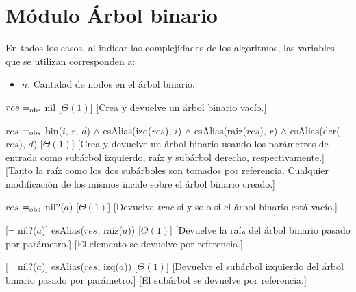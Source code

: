 \section{M\'odulo \'Arbol binario}

  En todos los casos, al indicar las complejidades de los algoritmos, las variables que se utilizan corresponden a:
  \vspace{-0.5em}\begin{itemize}
    \item $n$: Cantidad de nodos en el \'arbol binario.
  \end{itemize}


\begin{Interfaz}
  
  \begin{paramFormales}
    \paramGeneros{$\alpha$}
  \end{paramFormales}




    {$res =_{\mathrm{obs}}$ nil}
    [$\Theta(1)$]
    [Crea y devuelve un \'arbol binario vac\'io.]

    {$res$ $=_{\mathrm{obs}}$ bin($i$, $r$, $d$) $\land$ esAlias(izq($res$), $i$) $\land$ esAlias(raiz($res$), $r$) $\land$ esAlias(der($res$), $d$)}
    [$\Theta(1)$]
    [Crea y devuelve un \'arbol binario usando los par\'ametros de entrada como sub\'arbol izquierdo, ra\'iz y sub\'arbol derecho, respectivamente.]
    [Tanto la ra\'iz como los dos sub\'arboles son tomados por referencia. Cualquier modificaci\'on de los mismos incide sobre el \'arbol binario creado.]

    {$res$ $=_{\mathrm{obs}}$ nil?($a$)}
    [$\Theta(1)$]
    [Devuelve \emph{true} si y solo si el \'arbol binario est\'a vac\'io.]

    [$\neg$ nil?($a$)]
    {esAlias($res$, raiz($a$))}
    [$\Theta(1)$]
    [Devuelve la ra\'iz del \'arbol binario pasado por par\'ametro.]
    [El elemento se devuelve por referencia.]

    [$\neg$ nil?($a$)]
    {esAlias($res$, izq($a$))}
    [$\Theta(1)$]
    [Devuelve el sub\'arbol izquierdo del \'arbol binario pasado por par\'ametro.]
    [El sub\'arbol se devuelve por referencia.]


\end{Interfaz}
